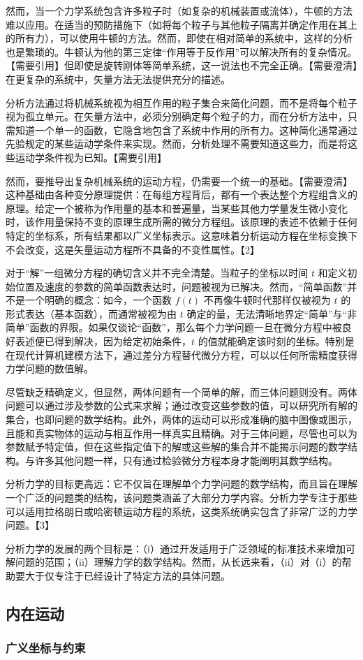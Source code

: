 然而，当一个力学系统包含许多粒子时（如复杂的机械装置或流体），牛顿的方法难以应用。在适当的预防措施下（如将每个粒子与其他粒子隔离并确定作用在其上的所有力），可以使用牛顿的方法。然而，即使在相对简单的系统中，这样的分析也是繁琐的。牛顿认为他的第三定律“作用等于反作用”可以解决所有的复杂情况。【需要引用】但即使是旋转刚体等简单系统，这一说法也不完全正确。【需要澄清】在更复杂的系统中，矢量方法无法提供充分的描述。

分析方法通过将机械系统视为相互作用的粒子集合来简化问题，而不是将每个粒子视为孤立单元。在矢量方法中，必须分别确定每个粒子的力，而在分析方法中，只需知道一个单一的函数，它隐含地包含了系统中作用的所有力。这种简化通常通过先验规定的某些运动学条件来实现。然而，分析处理不需要知道这些力，而是将这些运动学条件视为已知。【需要引用】

然而，要推导出复杂机械系统的运动方程，仍需要一个统一的基础。【需要澄清】这种基础由各种变分原理提供：在每组方程背后，都有一个表达整个方程组含义的原理。给定一个被称为作用量的基本和普遍量，当某些其他力学量发生微小变化时，该作用量保持不变的原理生成所需的微分方程组。该原理的表述不依赖于任何特定的坐标系，所有结果都以广义坐标表示。这意味着分析运动方程在坐标变换下不会改变，这是矢量运动方程所不具备的不变性属性。【2】

对于“解”一组微分方程的确切含义并不完全清楚。当粒子的坐标以时间 \( t \) 和定义初始位置及速度的参数的简单函数表达时，问题被视为已解决。然而，“简单函数”并不是一个明确的概念：如今，一个函数 \( f(t) \) 不再像牛顿时代那样仅被视为 \( t \) 的形式表达（基本函数），而通常被视为由 \( t \) 确定的量，无法清晰地界定“简单”与“非简单”函数的界限。如果仅谈论“函数”，那么每个力学问题一旦在微分方程中被良好表述便已得到解决，因为给定初始条件，\( t \) 的值就能确定该时刻的坐标。特别是在现代计算机建模方法下，通过差分方程替代微分方程，可以以任何所需精度获得力学问题的数值解。

尽管缺乏精确定义，但显然，两体问题有一个简单的解，而三体问题则没有。两体问题可以通过涉及参数的公式来求解；通过改变这些参数的值，可以研究所有解的集合，也即问题的数学结构。此外，两体的运动可以形成准确的脑中图像或图示，且能和真实物体的运动与相互作用一样真实且精确。对于三体问题，尽管也可以为参数赋予特定值，但在这些指定值下的解或这些解的集合并不能揭示问题的数学结构。与许多其他问题一样，只有通过检验微分方程本身才能阐明其数学结构。

分析力学的目标更高远：它不仅旨在理解单个力学问题的数学结构，而且旨在理解一个广泛的问题类的结构，该问题类涵盖了大部分力学内容。分析力学专注于那些可以适用拉格朗日或哈密顿运动方程的系统，这类系统确实包含了非常广泛的力学问题。【3】

分析力学的发展的两个目标是：（i）通过开发适用于广泛领域的标准技术来增加可解问题的范围；（ii）理解力学的数学结构。然而，从长远来看，（ii）对（i）的帮助要大于仅专注于已经设计了特定方法的具体问题。
\subsection{内在运动}  
\subsubsection{广义坐标与约束}  

